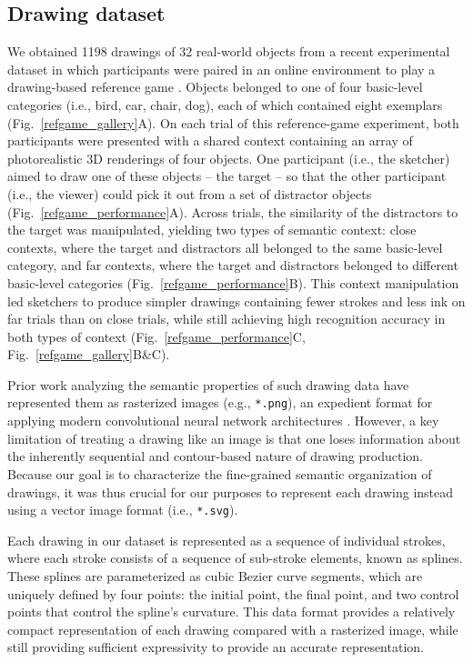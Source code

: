 \documentclass[10pt,letterpaper]{article}
\begin{document}
\subsection{Drawing dataset}
We obtained 1198 drawings of 32 real-world objects from a recent experimental dataset in which participants were paired in an online environment to play a drawing-based reference game \cite{fan2018modeling}.
Objects belonged to one of four basic-level categories (i.e., bird, car, chair, dog), each of which contained eight exemplars (Fig.~\ref{refgame_gallery}A).
On each trial of this reference-game experiment, both participants were presented with a shared context containing an array of photorealistic 3D renderings of four objects.   
One participant (i.e., the sketcher) aimed to draw one of these objects -- the target -- so that the other participant (i.e., the viewer) could pick it out from a set of distractor objects (Fig.~\ref{refgame_performance}A). 
Across trials, the similarity of the distractors to the target was manipulated, yielding two types of semantic context: close contexts, where the target and distractors all belonged to the same basic-level category, and far contexts, where the target and distractors belonged to different basic-level categories (Fig.~\ref{refgame_performance}B). 
This context manipulation led sketchers to produce simpler drawings containing fewer strokes and less ink on far trials than on close trials, while still achieving high recognition accuracy in both types of context (Fig.~\ref{refgame_performance}C, Fig.~\ref{refgame_gallery}B\&C). 
 
Prior work analyzing the semantic properties of such drawing data have represented them as rasterized images (e.g., \texttt{*.png}), an expedient format for applying modern convolutional neural network architectures \cite{FanCommon2018,sangkloy2016sketchy,yu2017sketch}. 
However, a key limitation of treating a drawing like an image is that one loses information about the inherently sequential and contour-based nature of drawing production. 
Because our goal is to characterize the fine-grained semantic organization of drawings, it was thus crucial for our purposes to represent each drawing instead using a vector image format (i.e., \texttt{*.svg}). 

Each drawing in our dataset is represented as a sequence of individual strokes, where each stroke consists of a sequence of sub-stroke elements, known as splines. 
These splines are parameterized as cubic Bezier curve segments, which are uniquely defined by four points: the initial point, the final point, and two control points that control the spline's curvature.
This data format provides a relatively compact representation of each drawing compared with a rasterized image, while still providing sufficient expressivity to provide an accurate representation. 
\end{document}
